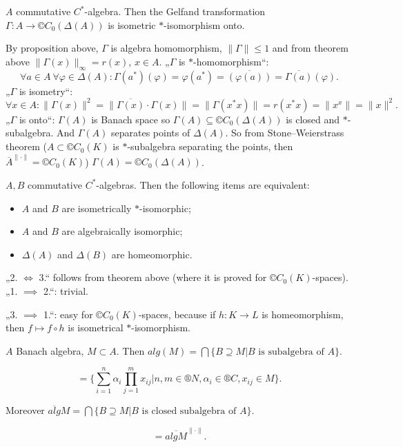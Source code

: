 \documentclass[12pt]{article}					%
\begin{document}
\begin{veta}
	$A$ commutative $C^*$-algebra. Then the Gelfand transformation $Γ: A \rightarrow ©C_0(Δ(A))$ is isometric $*$-isomorphism onto.

	\begin{dukazin}
		By proposition above, $Γ$ is algebra homomorphism, $\|Γ\| ≤ 1$ and from theorem above $\|Γ(x)\|_∞ = r(x)$, $x \in A$. „$Γ$ is $*$-homomorphism“:
		$$ \forall a \in A\ \forall φ \in Δ(A): Γ(a^*)(φ) = φ(a^*) = \overline{(φ(a))} = \overline{Γ(a)}(φ). $$
		„$Γ$ is isometry“:
		$$ \forall x \in A: \|Γ(x)\|^2 = \|\overline{Γ(x)}·Γ(x)\| = \|Γ(x^*x)\| = r(x^*x) = \|x^x\| = \|x\|^2. $$
		„$Γ$ is onto“: $Γ(A)$ is Banach space so $Γ(A) \subseteq ©C_0(Δ(A))$ is closed and $*$-subalgebra. And $Γ(A)$ separates points of $Δ(A)$. So from Stone–Weierstrass theorem ($A \subset ©C_0(K)$ is $*$-subalgebra separating the points, then $\overline{A}^{\|·\|} = ©C_0(K)$) $Γ(A) = ©C_0(Δ(A))$.
	\end{dukazin}
\end{veta}

\begin{dusledek}
	$A, B$ commutative $C^*$-algebras. Then the following items are equivalent:

	\begin{itemize}
		\item $A$ and $B$ are isometrically $*$-isomorphic;
		\item $A$ and $B$ are algebraically isomorphic;
		\item $Δ(A)$ and $Δ(B)$ are homeomorphic.
	\end{itemize}

	\begin{dukazin}
		„2. $\Leftrightarrow$ 3.“ follows from theorem above (where it is proved for $©C_0(K)$-spaces). „1. $\implies$ 2.“: trivial.

		„3. $\implies$ 1.“: easy for $©C_0(K)$-spaces, because if $h: K \rightarrow L$ is homeomorphism, then $f \mapsto f \circ h$ is isometrical $*$-isomorphism.
	\end{dukazin}
\end{dusledek}

\begin{definice}
	$A$ Banach algebra, $M \subset A$. Then $alg(M) = \bigcap \{B \supseteq M | B \text{ is subalgebra of } A\}$.

	\begin{poznamka}[Easy]
		$$ = \{\sum_{i=1}^n \alpha_i \prod_{j=1}^m x_{ij} | n, m \in ®N, \alpha_i \in ®C, x_{ij} \in M\}. $$
	\end{poznamka}

	Moreover $\overline{alg} M = \bigcap \{B \supseteq M | B \text{ is closed subalgebra of } A\}$.

	\begin{poznamka}[Easy]
		$$ = \overline{alg M}^{\|·\|}. $$
	\end{poznamka}
\end{definice}
\end{document}
